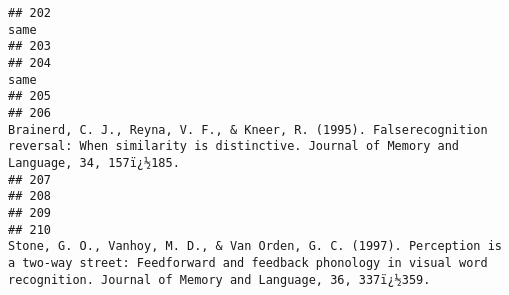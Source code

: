\documentclass[
  english,
  man]{apa6}
\begin{document}
\begin{verbatim}
## 202                                                                                                                                                                                                                                                                                                                same
## 203                                                                                                                                                                                                                                                                                                                    
## 204                                                                                                                                                                                                                                                                                                                same
## 205                                                                                                                                                                                                                                                                                                                    
## 206                                                                                                                                                        Brainerd, C. J., Reyna, V. F., & Kneer, R. (1995). Falserecognition reversal: When similarity is distinctive. Journal of Memory and Language, 34, 157ï¿½185.
## 207                                                                                                                                                                                                                                                                                                                    
## 208                                                                                                                                                                                                                                                                                                                    
## 209                                                                                                                                                                                                                                                                                                                    
## 210                                                                                                               Stone, G. O., Vanhoy, M. D., & Van Orden, G. C. (1997). Perception is a two-way street: Feedforward and feedback phonology in visual word recognition. Journal of Memory and Language, 36, 337ï¿½359.

\end{verbatim}
\end{document}
